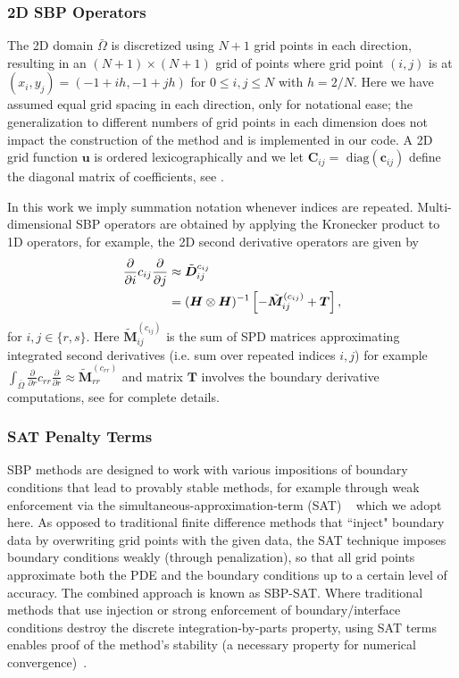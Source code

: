 \subsubsection{2D SBP Operators}\label{2d_sbp}
The 2D domain $\bar\Omega$ is discretized using $N+1$ grid points in each direction, resulting in an  $(N+1) \times (N+1)$
grid of points where grid point $(i,j)$ is at $(x_i, y_j) = (-1 + ih, -1 + jh)$ for $0
\leq i, j \leq N$ with $h = 2/N$. Here we have assumed equal grid spacing in each direction, only for notational ease; the generalization to different
numbers of grid points in each dimension does not
impact the construction of the method and is implemented in our code. A 2D grid function $\boldsymbol{u}$ is ordered lexicographically and we let $\boldsymbol{C}_{ij} = \text{ diag}(\boldsymbol{c}_{ij})$ define the diagonal matrix of coefficients, see \cite{Kozdon2020HybridizedSF}.

In this work we imply summation notation whenever indices are repeated. Multi-dimensional SBP operators are obtained by applying the Kronecker product to 1D operators, for example, the 2D second derivative operators are given by
\begin{align}\label{eqn: D2}
  \frac{\partial }{\partial i} c_{ij} \frac{\partial }{\partial j}&\approx \tilde{\boldsymbol{D}}^{c_{ij}}_{ij} \notag \\&= (\boldsymbol{H} \otimes \boldsymbol{H})^{-1}\left[- \tilde{\boldsymbol{M}}^{(c_{ij})}_{ij} + \boldsymbol{T}\right],
\end{align}
for $i, j \in \{r, s\}$.   
Here $\tilde{\boldsymbol{M}}^{(c_{ij})}_{ij}$ is the sum of SPD matrices approximating integrated second derivatives (i.e. sum over repeated indices $i, j$) for example $\int_{\bar\Omega} \frac{\partial}{\partial r} c_{rr} \frac{\partial}{\partial r}  \approx  \tilde{\boldsymbol{M}}^{(c_{rr})}_{rr}$ and matrix $\boldsymbol{T}$ involves the boundary derivative computations, see \cite{Erickson2022} for complete details.
 

\subsubsection{SAT Penalty Terms}
SBP methods are designed to work with various impositions of boundary conditions that lead to provably stable methods, for example through weak enforcement via the simultaneous-approximation-term (SAT) ~\cite{CarpenterGottliebAbarbanel1994} which we adopt here. As opposed to traditional finite difference methods that ``inject" boundary data by overwriting grid points with the given data, the SAT technique imposes boundary conditions weakly (through penalization), so that all grid points approximate both the PDE and the boundary conditions up to a certain level of accuracy.  The combined approach is known as SBP-SAT.
Where traditional methods that use injection or strong enforcement of boundary/interface conditions destroy the discrete integration-by-parts property, using SAT terms enables proof of the method's stability (a necessary property for numerical convergence)~\cite{Mattsson2003}.

